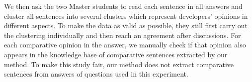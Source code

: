 \begin{comment}
\textcolor{red}{CCY: There are two options for this experiment, one is the user study for comparison, and the other is to semi-automatically find that how many comparative opinions in original answers have counterparts in our model.}

\textcolor{blue}{
I feel the second option would be easier and should be sufficient. 
Basically, we collect ground truth from explicit comparison posts, and use the ground-truth to evaluate our comparison sentence results.}

\textcolor{blue}{
One question, do we compare the ground-truth sentences and the extracted sentences at the sentence level or at the cluster level, or both?
The section ``Accuracy of Clustering Comparative Opinions'' somehow shows the usefulness of the clusters.
Do we have any evaluation of the usefulness of individual comparison sentences extracted?
If not, maybe here is a good place to evaluate the usefulness of individual comparison sentences extracted?}


We ask the 8 Master students mentioned in Section~\ref{sec:clusterEvaluate} to mark three metrics for each question on 5-point likert scale (1 being the worst and 5 being the best), i.e., \textcolor{red}{completeness and satisfaction ??Anything more?}, after inspecting the information in our model and reading the original question answers.	
\end{comment}

We then ask the two Master students to read each sentence in all answers and cluster all sentences into several clusters which represent developers' opinions in different aspects.
To make the data as valid as possible, they still first carry out the clustering individually and then reach an agreement after discussions.
For each comparative opinion in the answer, we manually check if that opinion also appears in the knowledge base of comparative sentences extracted by our method.
To make this study fair, our method does not extract comparative sentences from answers of questions used in this experiment.	
\begin{comment}
\textcolor{red}{\textbf{Do next few sentences sound reasonable?}}
Some comparative sentences from different answers actually share the same meaning such as \textcolor{red}{\textit{A??} is faster than \textit{B??} (post can transmit a larger amount of information than get)} and \textcolor{red}{\textit{B??} is slower than \textit{A??} (post has more capacity it can transfer more data than get)}.
We manually cluster all comparative sentences into different opinions.
And for each comparative opinion, we manually check if that opinion also appears in results from our model, and vice versa.
Note that to keep fair, our model will not extract comparative sentences from  those answers mentioned in this experiment.	
\end{comment}

